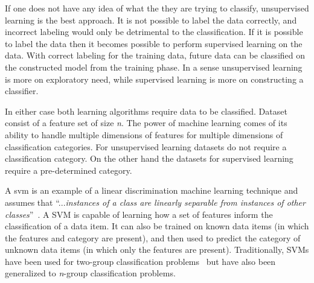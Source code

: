 If one does not have any idea of what the they are trying to classify, unsupervised learning is the best approach. It is not possible to label the data correctly, and incorrect labeling would only be detrimental to the classification. If it is possible to label the data then it becomes possible to perform supervised learning on the data. With correct labeling for the training data, future data can be classified on the constructed model from the training phase. In a sense unsupervised learning is more on exploratory need, while supervised learning is more on constructing a classifier.

In either case both learning algorithms require data to be classified. Dataset consist of a feature set of size \emph{n}. The power of machine learning comes of its ability to handle multiple dimensions of features for multiple dimensions of classification categories. For unsupervised learning datasets do not require a classification category. On the other hand the datasets for supervised learning require a pre-determined category.

A \gls{svm} is an example of a linear discrimination machine learning technique and assumes that ``...\emph{instances of a class are linearly separable from instances of other classes}''~\cite{ALP04}. A SVM is capable of learning how a set of features inform the classification of a data item. It can also be trained on known data items (in which the features and category are present), and then used to predict the category of unknown data items (in which only the features are present). Traditionally, SVMs have been used for two-group classification problems~\cite{CV95} but have also been generalized to \emph{n}-group classification problems.
